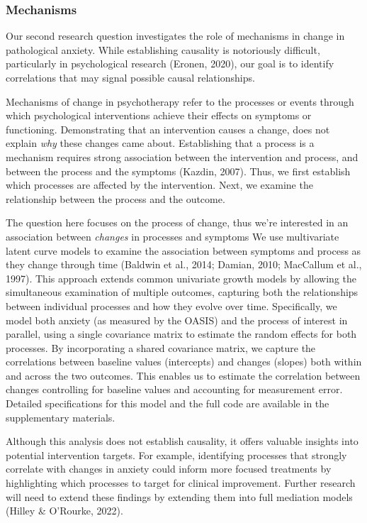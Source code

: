\documentclass[
  man,floatsintext]{apa7}
\begin{document}
\subsubsection{Mechanisms}\label{mechanisms}

Our second research question investigates the role of mechanisms in change in pathological anxiety.
While establishing causality is notoriously difficult, particularly in psychological research (Eronen, 2020), our goal is to identify correlations that may signal possible causal relationships.

Mechanisms of change in psychotherapy refer to the processes or events through which psychological interventions achieve their effects on symptoms or functioning.
Demonstrating that an intervention causes a change, does not explain \emph{why} these changes came about.
Establishing that a process is a mechanism requires strong association between the intervention and process, and between the process and the symptoms (Kazdin, 2007).
Thus, we first establish which processes are affected by the intervention.
Next, we examine the relationship between the process and the outcome.

The question here focuses on the process of change, thus we're interested in an association between \emph{changes} in processes and symptoms
We use multivariate latent curve models to examine the association between symptoms and process as they change through time (Baldwin et al., 2014; Damian, 2010; MacCallum et al., 1997).
This approach extends common univariate growth models by allowing the simultaneous examination of multiple outcomes, capturing both the relationships between individual processes and how they evolve over time.
Specifically, we model both anxiety (as measured by the OASIS) and the process of interest in parallel, using a single covariance matrix to estimate the random effects for both processes.
By incorporating a shared covariance matrix, we capture the correlations between baseline values (intercepts) and changes (slopes) both within and across the two outcomes.
This enables us to estimate the correlation between changes controlling for baseline values and accounting for measurement error.
Detailed specifications for this model and the full code are available in the supplementary materials.

Although this analysis does not establish causality, it offers valuable insights into potential intervention targets.
For example, identifying processes that strongly correlate with changes in anxiety could inform more focused treatments by highlighting which processes to target for clinical improvement.
Further research will need to extend these findings by extending them into full mediation models (Hilley \& O'Rourke, 2022).
\end{document}

